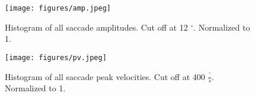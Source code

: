 \documentclass[10pt,a4paper,twocolumn]{article}
\begin{document}
\begin{figure}
\centering
\texttt{[image: figures/amp.jpeg]}
        \caption[Histogram of saccade amplitude]{Histogram of all saccade amplitudes. Cut off at 12 $^\circ$. Normalized to 1. }
        \label{amp}
\end{figure}    

\begin{figure}
\centering
\texttt{[image: figures/pv.jpeg]}
        \caption[Histogram of peak velocity]{Histogram of all saccade peak velocities. Cut off at 400 $\frac{^\circ} {s}$. Normalized to 1. }
        \label{pv}
\end{figure}

\end{document}
